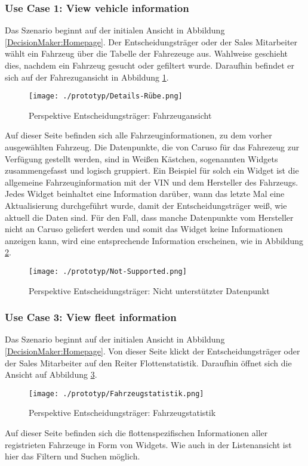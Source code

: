 \subsubsection{Use Case 1: View vehicle information}
Das Szenario beginnt auf der initialen Ansicht in Abbildung \ref{DecisionMaker:Homepage}. Der Entscheidungsträger oder der Sales Mitarbeiter wählt ein Fahrzeug über die Tabelle der Fahrezeuge aus. Wahlweise geschieht dies, nachdem ein Fahrzeug gesucht oder gefiltert wurde. Daraufhin befindet er sich auf der Fahrezugansicht in Abbildung \ref{DecisionMaker:DetailsRube}.

\begin{figure}[ht]
  \centering
  \texttt{[image: ./prototyp/Details-Rübe.png]}
  \caption{Perspektive Entscheidungsträger: Fahrzeugansicht}
  \label{DecisionMaker:DetailsRube}
\end{figure}

Auf dieser Seite befinden sich alle Fahrzeuginformationen, zu dem vorher ausgewählten Fahrzeug. Die Datenpunkte, die von Caruso für das Fahrezeug zur Verfügung gestellt werden, sind in Weißen Kästchen, sogenannten Widgets zusammengefasst und logisch gruppiert. Ein Beispiel für solch ein Widget ist die allgemeine Fahrzeuginformation mit der VIN und dem Hersteller des Fahrzeugs. Jedes Widget beinhaltet eine Information darüber, wann das letzte Mal eine Aktualisierung durchgeführt wurde, damit der Entscheidungsträger weiß, wie aktuell die Daten sind. Für den Fall, dass manche Datenpunkte vom Hersteller nicht an Caruso geliefert werden und somit das Widget keine Informationen anzeigen kann, wird eine entsprechende Information erscheinen, wie in Abbildung \ref{DecisionMaker:NotSupported}.


\begin{figure}[ht]
  \centering
  \texttt{[image: ./prototyp/Not-Supported.png]}
  \caption{Perspektive Entscheidungsträger: Nicht unterstützter Datenpunkt}
  \label{DecisionMaker:NotSupported}
\end{figure}

\subsubsection{Use Case 3: View fleet information}
Das Szenario beginnt auf der initialen Ansicht in Abbildung \ref{DecisionMaker:Homepage}. Von dieser Seite klickt der Entscheidungsträger oder der Sales Mitarbeiter auf den Reiter Flottenstatistik. Daraufhin öffnet sich die Ansicht auf Abbildung \ref{DecisionMaker:Fahrzeugstatistik}.
\begin{figure}[H]
  \centering
  \texttt{[image: ./prototyp/Fahrzeugstatistik.png]}
  \caption{Perspektive Entscheidungsträger: Fahrzeugstatistik}
  \label{DecisionMaker:Fahrzeugstatistik}
\end{figure}
Auf dieser Seite befinden sich die flottenspezifischen Informationen aller registrieten Fahrzeuge in Form von Widgets. Wie auch in der Listenansicht ist hier das Filtern und Suchen möglich.


